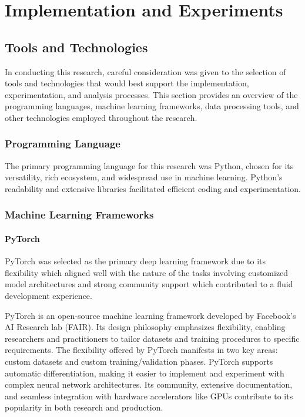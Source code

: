 
\chapter{Implementation and Experiments} %

\label{Chapter5}

\section{Tools and Technologies}
In conducting this research, careful consideration was given to the selection of tools and technologies that would best support the implementation, experimentation, and analysis processes. This section provides an overview of the programming languages, machine learning frameworks, data processing tools, and other technologies employed throughout the research.

\subsection{Programming Language}
The primary programming language for this research was Python, chosen for its versatility, rich ecosystem, and widespread use in machine learning. Python's readability and extensive libraries facilitated efficient coding and experimentation.

\subsection{Machine Learning Frameworks}

\subsubsection{PyTorch}
PyTorch \cite{PyTorch} was selected as the primary deep learning framework due to its flexibility which aligned well with the nature of the tasks involving customized model architectures and strong community support which contributed to a fluid development experience.

PyTorch is an open-source machine learning framework developed by Facebook's AI Research lab (FAIR). Its design philosophy emphasizes flexibility, enabling researchers and practitioners to tailor datasets and training procedures to specific requirements. The flexibility offered by PyTorch manifests in two key areas: custom datasets and custom training/validation phases. PyTorch supports automatic differentiation, making it easier to implement and experiment with complex neural network architectures. Its community, extensive documentation, and seamless integration with hardware accelerators like GPUs contribute to its popularity in both research and production.

